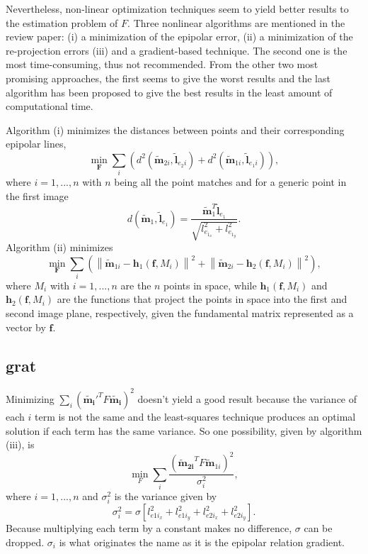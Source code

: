 Nevertheless, non-linear optimization techniques seem to yield better results to the estimation problem of $F$. Three nonlinear algorithms are mentioned in the review paper: (i) a minimization of the epipolar error, (ii) a minimization of the re-projection errors (iii) and a gradient-based technique. The second one is the most time-consuming, thus not recommended. From the other two most promising approaches, the first seems to give the worst results and the last algorithm has been proposed to give the best results in the least amount of computational time. 

Algorithm (i) minimizes the distances between points and their corresponding epipolar lines,
\begin{equation}
\label{cha2:sec3:eq:mee}
	\min_{\mathbf{F}} \sum_{i}\left(
	d^{2}(\widetilde{\mathbf{m}}_{2i}, \widetilde{\mathbf{l}}_{e_2i})
	+
	d^{2}(\widetilde{\mathbf{m}}_{1i}, \widetilde{\mathbf{l}}_{e_1i})\right),
\end{equation}
where $i=1,...,n$ with $n$ being all the point matches and for a generic point in the first image
\begin{equation}
\label{cha2:sec3:eq:meed}
	d(\widetilde{\mathbf{m}}_1, \widetilde{\mathbf{l}}_{e_1}) = \frac{\widetilde{\mathbf{m}}_1^T \widetilde{\mathbf{l}}_{e_1}}{\sqrt{l_{e_{1_x}}^2+l_{e_{1_y}}^2}}.
\end{equation}
Algorithm (ii) minimizes 
\begin{equation}
\label{cha2:sec3:eq:al3}
	\min_{\mathbf{F}}\sum_{i}
	\left(
	\left\|\widetilde{\mathbf{m}}_{1i}-\mathbf{h}_1(\mathbf{f}, M_i)\right\|^2
	+
	\left\|\widetilde{\mathbf{m}}_{2i}-\mathbf{h}_2(\mathbf{f}, M_i)\right\|^2\right),
\end{equation}
where $M_i$ with $i=1,...,n$ are the $n$ points in space, while $\mathbf{h}_1(\mathbf{f}, M_i)$ and $\mathbf{h}_2(\mathbf{f}, M_i)$ are the functions that project the points in space into the first and second image plane, respectively, given the fundamental matrix represented as a vector by $\mathbf{f}$.

\subsection{\acrfull{grat}}

Minimizing $ \sum_i (\mathbf{\widetilde{m_i}}'^T F \mathbf{\widetilde{m_i}})^2$ doesn't yield a good result because the variance of each $i$ term is not the same and the least-squares technique produces an optimal solution if each term has the same variance.
So one possibility, given by algorithm (iii), is
\begin{equation}
\min_F \sum_i \frac{ (\mathbf{\widetilde{\mathbf{m}}_{2i}}^T F \widetilde{\mathbf{m}}_{1i})^2}{\sigma_i^2},
\end{equation}
where $i=1,...,n$ and $\sigma_i^2$ is the variance given by 
\begin{equation}
\sigma_i^2 = \sigma [l_{{e1i}_x}^2 + l_{{e1i}_y}^2 + l_{{e2i}_x}^2 + l_{{e2i}_y}^2].
\end{equation}
Because multiplying each term by a constant makes no difference, $\sigma$ can be dropped. $\sigma_i$ is what originates the name as it is the  epipolar relation gradient.


